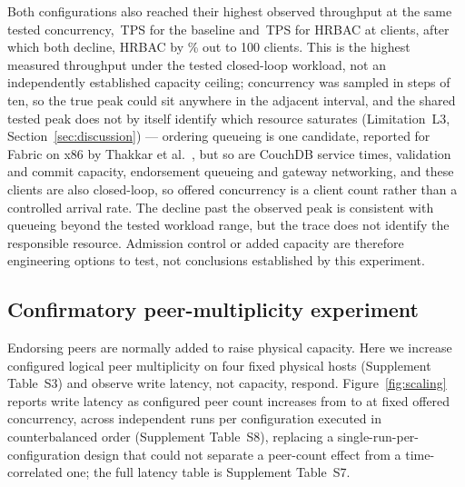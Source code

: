 \documentclass[a4paper,fleqn]{cas-sc}
\begin{document}
Both configurations also reached their highest observed throughput at the
same tested concurrency, \PeakBaselineTPS\,TPS for the baseline and
\PeakHrbacTPS\,TPS for HRBAC at \KneeClients{} clients, after which both
decline, HRBAC by \PostKneeDeclinePct\% out to 100 clients. This is the
highest measured throughput under the tested closed-loop workload, not an
independently established capacity ceiling; concurrency was sampled in
steps of ten, so the true peak could sit anywhere in the adjacent
interval, and the shared tested peak does not by itself identify which
resource saturates (Limitation~L3, Section~\ref{sec:discussion}) —
ordering queueing is one candidate, reported for Fabric on x86 by
Thakkar et al.~\cite{thakkar2018performance}, but so are CouchDB service
times, validation and commit capacity, endorsement queueing and gateway
networking, and these clients are also closed-loop, so offered
concurrency is a client count rather than a controlled arrival rate. The
decline past the observed peak is consistent with queueing beyond the
tested workload range, but the trace does not identify the responsible
resource. Admission control or added capacity are therefore engineering
options to test, not conclusions established by this experiment.

\subsection{Confirmatory peer-multiplicity experiment}
\label{subsec:scaling}

Endorsing peers are normally added to raise physical capacity. Here we
increase configured logical peer multiplicity on four fixed physical
hosts (Supplement Table~S3) and observe write latency, not capacity,
respond. Figure~\ref{fig:scaling} reports write latency as configured peer
count increases from \ScaleMinPeers{} to \ScaleMaxPeers{} at fixed offered
concurrency, across \PartRunsPerConfig{} independent runs per configuration
executed in counterbalanced order (Supplement Table~S8), replacing a
  single-run-per-configuration design that could not separate a peer-count
  effect from a time-correlated one; the
full latency table is Supplement Table~S7.
\end{document}
